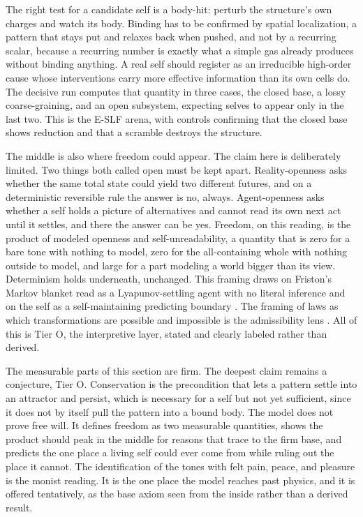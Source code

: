 The right test for a candidate self is a body-hit: perturb the structure's own charges and watch its body. Binding has to be confirmed by spatial localization, a pattern that stays put and relaxes back when pushed, and not by a recurring scalar, because a recurring number is exactly what a simple gas already produces without binding anything. A real self should register as an irreducible high-order cause whose interventions carry more effective information than its own cells do. The decisive run computes that quantity in three cases, the closed base, a lossy coarse-graining, and an open subsystem, expecting selves to appear only in the last two. This is the E-SLF arena, with controls confirming that the closed base shows reduction and that a scramble destroys the structure.

The middle is also where freedom could appear. The claim here is deliberately limited. Two things both called open must be kept apart. Reality-openness asks whether the same total state could yield two different futures, and on a deterministic reversible rule the answer is no, always. Agent-openness asks whether a self holds a picture of alternatives and cannot read its own next act until it settles, and there the answer can be yes. Freedom, on this reading, is the product of modeled openness and self-unreadability, a quantity that is zero for a bare tone with nothing to model, zero for the all-containing whole with nothing outside to model, and large for a part modeling a world bigger than its view. Determinism holds underneath, unchanged. This framing draws on Friston's Markov blanket read as a Lyapunov-settling agent with no literal inference \cite{friston2010} and on the self as a self-maintaining predicting boundary \cite{fields2018}. The framing of laws as which transformations are possible and impossible is the admissibility lens \cite{deutsch2015, marletto2017}. All of this is Tier O, the interpretive layer, stated and clearly labeled rather than derived.

The measurable parts of this section are firm. The deepest claim remains a conjecture, Tier O. Conservation is the precondition that lets a pattern settle into an attractor and persist, which is necessary for a self but not yet sufficient, since it does not by itself pull the pattern into a bound body. The model does not prove free will. It defines freedom as two measurable quantities, shows the product should peak in the middle for reasons that trace to the firm base, and predicts the one place a living self could ever come from while ruling out the place it cannot. The identification of the tones with felt pain, peace, and pleasure is the monist reading. It is the one place the model reaches past physics, and it is offered tentatively, as the base axiom seen from the inside rather than a derived result.
